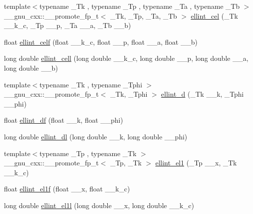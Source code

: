 \begin{DoxyCompactItemize}
\item 
{\footnotesize template$<$typename \+\_\+\+Tk , typename \+\_\+\+Tp , typename \+\_\+\+Ta , typename \+\_\+\+Tb $>$ }\\\+\_\+\+\_\+gnu\+\_\+cxx\+::\+\_\+\+\_\+promote\+\_\+fp\+\_\+t$<$ \+\_\+\+Tk, \+\_\+\+Tp, \+\_\+\+Ta, \+\_\+\+Tb $>$ \hyperlink{group__gnu__math__spec__func_ga45ad61f29827bcf27d05ead27490fe84}{ellint\+\_\+cel} (\+\_\+\+Tk \+\_\+\+\_\+k\+\_\+c, \+\_\+\+Tp \+\_\+\+\_\+p, \+\_\+\+Ta \+\_\+\+\_\+a, \+\_\+\+Tb \+\_\+\+\_\+b)
\item 
float \hyperlink{group__gnu__math__spec__func_ga6d8fbef7853cf37de11278b1ff7127e8}{ellint\+\_\+celf} (float \+\_\+\+\_\+k\+\_\+c, float \+\_\+\+\_\+p, float \+\_\+\+\_\+a, float \+\_\+\+\_\+b)
\item 
long double \hyperlink{group__gnu__math__spec__func_gaa5add699fb2b4b02e63f8725a3a79750}{ellint\+\_\+cell} (long double \+\_\+\+\_\+k\+\_\+c, long double \+\_\+\+\_\+p, long double \+\_\+\+\_\+a, long double \+\_\+\+\_\+b)
\item 
{\footnotesize template$<$typename \+\_\+\+Tk , typename \+\_\+\+Tphi $>$ }\\\+\_\+\+\_\+gnu\+\_\+cxx\+::\+\_\+\+\_\+promote\+\_\+fp\+\_\+t$<$ \+\_\+\+Tk, \+\_\+\+Tphi $>$ \hyperlink{group__gnu__math__spec__func_ga71785ba6bad83f009cb2dc4d2d574194}{ellint\+\_\+d} (\+\_\+\+Tk \+\_\+\+\_\+k, \+\_\+\+Tphi \+\_\+\+\_\+phi)
\item 
float \hyperlink{group__gnu__math__spec__func_ga02ed50be21fdd84ad6bed003f94a9e69}{ellint\+\_\+df} (float \+\_\+\+\_\+k, float \+\_\+\+\_\+phi)
\item 
long double \hyperlink{group__gnu__math__spec__func_gaa34bcb8e316f2e8b2b2bf48cd89abd98}{ellint\+\_\+dl} (long double \+\_\+\+\_\+k, long double \+\_\+\+\_\+phi)
\item 
{\footnotesize template$<$typename \+\_\+\+Tp , typename \+\_\+\+Tk $>$ }\\\+\_\+\+\_\+gnu\+\_\+cxx\+::\+\_\+\+\_\+promote\+\_\+fp\+\_\+t$<$ \+\_\+\+Tp, \+\_\+\+Tk $>$ \hyperlink{group__gnu__math__spec__func_gac012a02a3d206b2f2a0638ffd3693b83}{ellint\+\_\+el1} (\+\_\+\+Tp \+\_\+\+\_\+x, \+\_\+\+Tk \+\_\+\+\_\+k\+\_\+c)
\item 
float \hyperlink{group__gnu__math__spec__func_ga8d8342bb4f42c7fe09b5589c54d4e713}{ellint\+\_\+el1f} (float \+\_\+\+\_\+x, float \+\_\+\+\_\+k\+\_\+c)
\item 
long double \hyperlink{group__gnu__math__spec__func_gaeed1201e421be410460739048cba5cd8}{ellint\+\_\+el1l} (long double \+\_\+\+\_\+x, long double \+\_\+\+\_\+k\+\_\+c)

\end{DoxyCompactItemize}
